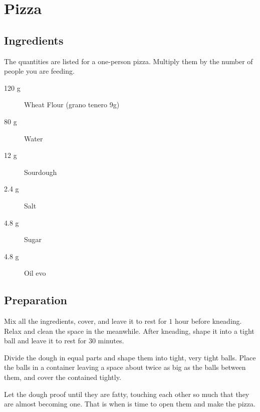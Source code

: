 \setchapterpreamble[u]{\margintoc}
\chapter{Pizza}

\section{Ingredients}
The quantities are listed for a one-person pizza. Multiply them by the number of people you are feeding.

\begin{multicols}{2}
\begin{description}
	\item[120 g] Wheat Flour (grano tenero 9g)
	\item[80 g] Water
	\item[12 g] Sourdough
	\item[2.4 g] Salt
	\item[4.8 g] Sugar
	\item[4.8 g] Oil \gls{evo}
\end{description}
\end{multicols}

\section{Preparation}
Mix all the ingredients, cover, and leave it to rest for $1$ hour before kneading.
%
Relax and clean the space in the meanwhile.
%
After kneading, shape it into a tight ball and leave it to rest for $30$ minutes.

Divide the dough in equal parts and shape them into tight, very tight balls.
%
Place the balls in a container leaving a space about twice as big as the balls between them, and cover the contained tightly.

Let the dough proof until they are fatty, touching each other so much that they are almost becoming one. That is when is time to open them and make the pizza.

